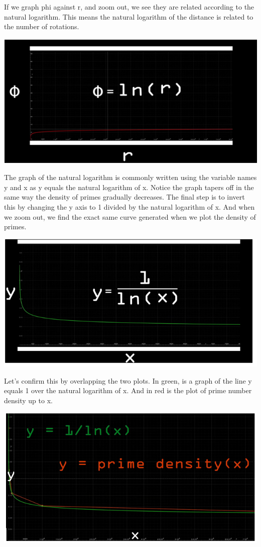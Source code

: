 \documentclass{report}
\begin{document}
 If we graph phi against r, and zoom out, we see they are related according to the natural logarithm. This means the natural logarithm of the distance is related to the number of rotations.
\begin{center}
	\includegraphics[scale=1]{62.png}
\end{center}
The graph of the natural logarithm is commonly written using the variable names y and x as y equals the natural logarithm of x. Notice the graph tapers off in the same way the density of primes gradually decreases. The final step is to invert this by changing the y axis to 1 divided by the natural logarithm of x. And when we zoom out, we find the exact same curve generated when we plot the density of primes. 
\begin{center}
	\includegraphics[scale=1]{63.png}
\end{center}
Let's confirm this by overlapping the two plots. In green, is a graph of the line y equals 1 over the natural logarithm of x. And in red is the plot of prime number density up to x.
\begin{center}
	\includegraphics[scale=1]{64.png}
\end{center}
\end{document}
